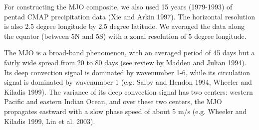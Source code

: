 \documentclass[12pt]{article}
\begin{document}
For constructing the MJO composite, 
we also used 15 years (1979-1993) of pentad CMAP precipitation data 
(Xie and Arkin 1997).  The horizontal resolution is also 2.5 degree 
longitude by 2.5 degree latitude. We averaged the data along the equator
(between 5N and 5S) with a zonal resolution of 5 degree longitude.
\\


The MJO is a broad-band phenomenon, with an averaged period of 45 days
but a fairly wide spread from 20 to 80 days
(see review by Madden and Julian 1994). Its deep convection signal is
dominated by wavenumber 1-6, while its circulation signal is dominated
by wavenumber 1 (e.g. Salby and Hendon 1994, Wheeler and Kiladis 1999).
The variance of its deep convection signal has two centers: western
Pacific and eastern Indian Ocean, and over these two centers, the MJO
propagates eastward with a slow phase speed of about 5 m/s
(e.g. Wheeler and Kiladis 1999, Lin et al. 2003).
\end{document}
